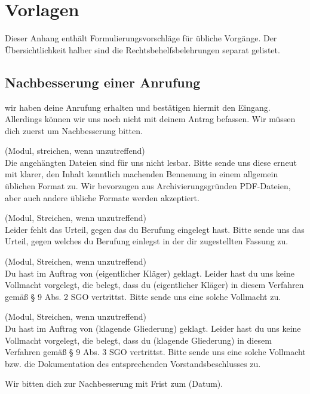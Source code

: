 
\chapter{Vorlagen}
\label{Vorlage}
Dieser Anhang enthält Formulierungsvorschläge für übliche Vorgänge.
Der Übersichtlichkeit halber sind die Rechtsbehelfsbelehrungen separat gelistet.

\section{Nachbesserung einer Anrufung}
\label{Vorlage:Anrufungsnachbesserung}
wir haben deine Anrufung erhalten und bestätigen hiermit den Eingang.
Allerdings können wir uns noch nicht mit deinem Antrag befassen.
Wir müssen dich zuerst um Nachbesserung bitten.

(Modul, streichen, wenn unzutreffend)\\
Die angehängten Dateien sind für uns nicht lesbar.
Bitte sende uns diese erneut mit klarer, den Inhalt kenntlich machenden Bennenung in einem allgemein üblichen Format zu.
Wir bevorzugen aus Archivierungsgründen PDF-Dateien, aber auch andere übliche Formate werden akzeptiert.

(Modul, Streichen, wenn unzutreffend)\\
Leider fehlt das Urteil, gegen das du Berufung eingelegt hast.
Bitte sende uns das Urteil, gegen welches du Berufung einlegst in der dir zugestellten Fassung zu.

(Modul,  Streichen, wenn unzutreffend)\\
Du hast im Auftrag von (eigentlicher Kläger) geklagt.
Leider hast du uns keine Vollmacht vorgelegt, die belegt, dass du (eigentlicher Kläger) in diesem Verfahren gemäß § 9 Abs. 2 SGO vertrittst.
Bitte sende uns eine solche Vollmacht zu.

(Modul,  Streichen, wenn unzutreffend)\\
Du hast im Auftrag von (klagende Gliederung) geklagt.
Leider hast du uns keine Vollmacht vorgelegt, die belegt, dass du (klagende Gliederung) in diesem Verfahren gemäß § 9 Abs. 3 SGO vertrittst.
Bitte sende uns eine solche Vollmacht bzw. die Dokumentation des entsprechenden Vorstandsbeschlusses zu.

Wir bitten dich zur Nachbesserung mit Frist zum (Datum).

